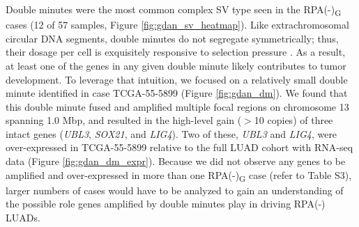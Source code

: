 \documentclass[phd,tocprelim]{cornell}
\renewcommand{\caption}[1]{\singlespacing\hangcaption{#1}\normalspacing}
\begin{document}
Double minutes were the most common complex SV type seen in the RPA(-)\textsubscript{G} cases (12 of 57 samples, Figure \ref{fig:gdan_sv_heatmap}). Like extrachromosomal circular DNA segments, double minutes do not segregate symmetrically; thus, their dosage per cell is exquisitely responsive to selection pressure \cite{Verhaak2019,Wu2019-ap}. As a result, at least one of the genes in any given double minute likely contributes to tumor development. To leverage that intuition, we focused on a relatively small double minute identified in case TCGA-55-5899 (Figure \ref{fig:gdan_dm}). We found that this double minute fused and amplified multiple focal regions on chromosome 13 spanning 1.0 Mbp, and resulted in the high-level gain ($>$10 copies) of three intact genes (\textit{UBL3}, \textit{SOX21}, and \textit{LIG4}). Two of these, \textit{UBL3} and \textit{LIG4}, were over-expressed in TCGA-55-5899 relative to the full LUAD cohort with RNA-seq data (Figure \ref{fig:gdan_dm_expr}). Because we did not observe any genes to be amplified and over-expressed in more than one RPA(-)\textsubscript{G} case (refer to \cite{Carrot-Zhang2020-vl} Table S3), larger numbers of cases would have to be analyzed to gain an understanding of the possible role genes amplified by double minutes play in driving RPA(-) LUADs.

\clearpage
\begin{figure}[!ht]
\end{figure}
\end{document}
